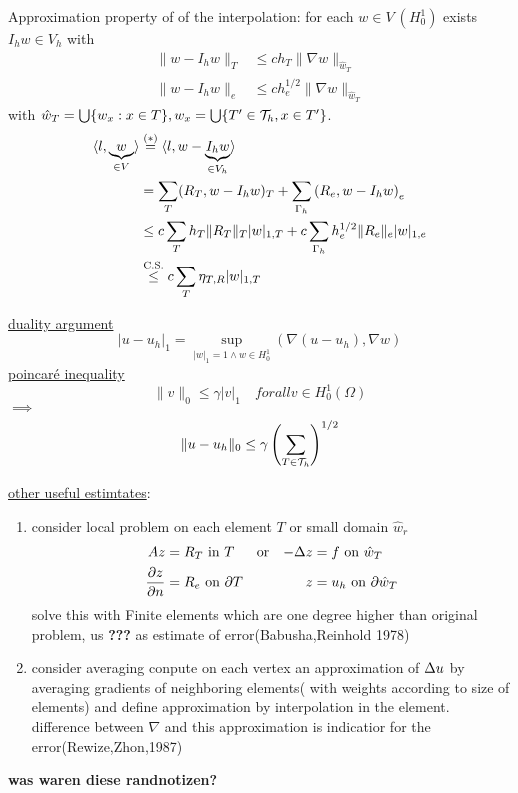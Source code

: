 Approximation property of of the interpolation:\nl
for each $w\in V\ (H^1_0)$ exists $I_hw\in V_h$ with 
\begin{align*}
	\|w-I_hw\|_T &\leq c h_T \|\nabla w\|_{\hat{w}_T}\\
	\|w-I_hw\|_e &\leq c h^{1/2}_e \|\nabla w\|_{\hat{w}_T}
\end{align*}
with $\hat{w}_T = \bigcup\{w_x:x\in T\}, w_x = \bigcup \{T'\in\mathcal{T}_h,x\in T'\}$.
\begin{align*}
	\langle l,\underbrace{w}_{\in V} \rangle &\stackrel{(*)}{=} \langle l,w-\underbrace{I_hw}_{\in V_h} \rangle\\
	&= \sum \limits_T  (R_T,w-I_hw)_T + \sum \limits_{\Gamma_h} \left(R_e,w-I_hw\right)_e\\
	&\leq c\sum \limits_T h_T  \|R_T\|_T |w|_{1,T} + c\sum \limits_{\Gamma_h} h^{1/2}_e \|R_e\|_e |w|_{1,e}\\
	&\stackrel{\text{C.S.}}{\leq} c\sum \limits_T \eta_{T,R} |w|_{1,T}
\end{align*}

\underline{duality argument}
\begin{equation*}
	|u-u_h|_1 = \underset{|w|_1=1 \land w\in H^1_0}{\sup} ( \nabla(u-u_h),\nabla w)
\end{equation*}
\underline{poincaré inequality}
\begin{equation*}
	\|v\|_0 \leq \gamma |v|_1 \quad forall v \in H^1_0(\Omega)
\end{equation*}
$\implies$
\begin{equation*}
	\|u-u_h\|_0 \leq \gamma \left( \sum \limits_{T \in \mathcal{T}_h}\right)^{1/2}
\end{equation*}

\underline{other useful estimtates}:
\begin{enumerate}[label= (\alph*)]
	\item consider local problem on each element $T$ or small domain $\hat{w}_r$ 
	\begin{align*}
		Az &= R_T \text{ in } T  &&\text{or}& -\Delta z&= f \text{ on } \hat{w}_T\\
		\frac{\partial z}{\partial n} &= R_e \text{ on } \partial T  &&& z &= u_h \text{ on } \partial \hat{w}_T
	\end{align*}
	solve this with Finite elements which are one degree higher than original problem, us \textbf{???} as estimate of error(Babusha,Reinhold 1978) 
	\item consider averaging\nl
	conpute on each vertex an approximation of $\Delta u$ by averaging gradients of neighboring elements( with weights according to size of elements) and define approximation by interpolation in the element.\nl
	difference between $\nabla $ and this approximation is indicatior for the error(Rewize,Zhon,1987)
\end{enumerate}
\textbf{was waren diese randnotizen?}
